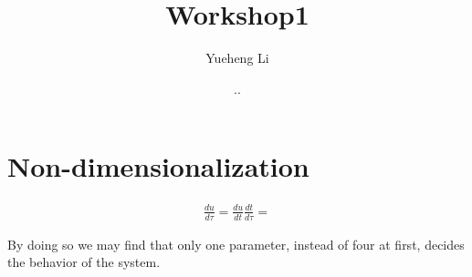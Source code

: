\documentclass{article}
\renewcommand{\today}{\number\year.\number\month.\number\day}
\begin{document}
\title{Workshop1}
\author{Yueheng Li}
\date{\today}
\maketitle


\section{Non-dimensionalization}

\begin{align*}
	\frac{du}{d\tau}=\frac{du}{dt}\frac{dt}{d\tau}=
\end{align*}


By doing so we may find that only one parameter, instead of four at first, decides the behavior of the system. 
\end{document}
